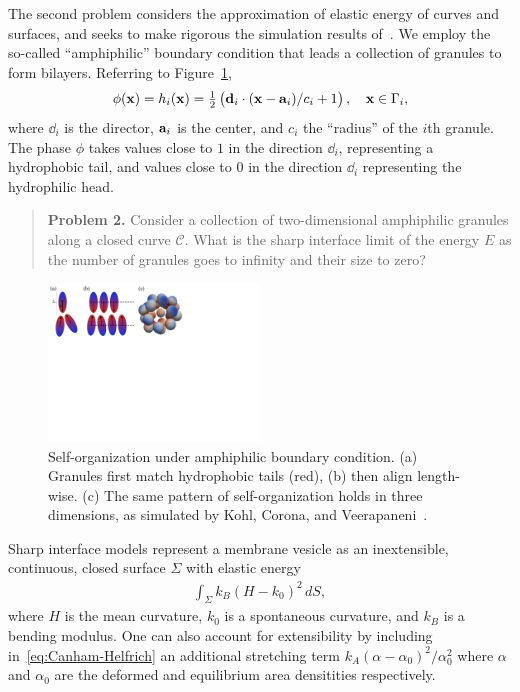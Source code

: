 The second problem considers the approximation of elastic energy of
curves and surfaces, and seeks to make rigorous the simulation results
of~\cite{FuQuRyYo22, Fu2018_SIAM}. We employ the so-called
``amphiphilic'' boundary condition that leads a collection of
granules to form bilayers. Referring to
Figure~\ref{fig:amphiphilic_assembly}, 
\begin{align}
\label{eq:amphiphilic_BC}
  \phi(\xx) = h_i(\xx) = \tfrac{1}{2}\left(\dd_i \cdot 
    (\xx - \aa_i)/c_i + 1\right), \quad \xx \in \Gamma_i,
\end{align}
where $\dd_i$ is the director, $\aa_i$ is the center, and $c_i$ the
``radius'' of the $i$th granule. The phase $\phi$ takes values close to
$1$ in the direction $\dd_i$, representing a hydrophobic tail, and
values close to $0$ in the direction $\dd_i$ representing the
hydrophilic head.

\begin{quotation}
  \noindent
  \textbf{Problem 2.}
  Consider a collection of two-dimensional amphiphilic granules along a
  closed curve $\mathcal{C}$. What is the sharp interface limit of the
  energy $E$ as the number of granules goes to infinity and their size
  to zero?
\end{quotation}

\begin{figure}
  \vspace{-8pt}
  \centerline{\includegraphics[width=0.5\textwidth]{figures/SA1Figures/AmphiphilicAssembly.pdf}}
  \vspace{-8pt}
  \caption{\label{fig:amphiphilic_assembly} \footnotesize
  Self-organization under amphiphilic boundary condition. (a) Granules
  first match hydrophobic tails (red), (b) then align length-wise. (c)
  The same pattern of self-organization holds in three dimensions, as
  simulated by Kohl, Corona, and
  Veerapaneni~\cite{koh-cor-che-vee2021}.}
\end{figure}

Sharp interface models represent a membrane vesicle as an
inextensible, continuous, closed surface $\Sigma$ with elastic energy
\begin{align}
  \label{eq:Canham-Helfrich}
  \int_{\Sigma} k_B(H - k_0)^2\, dS,
\end{align}
where $H$ is the mean curvature, $k_0$ is a spontaneous curvature, and
$k_B$ is a bending modulus. One can also account for extensibility by
including in~\eqref{eq:Canham-Helfrich} an additional stretching term
$k_A(\alpha - \alpha_0)^2/\alpha_0^2$ where $\alpha$ and $\alpha_0$ are
the deformed and equilibrium area densitities respectively.

